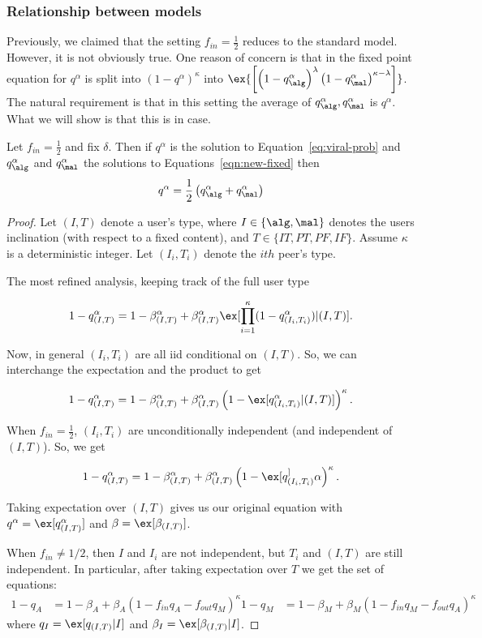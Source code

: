 \subsubsection{Relationship between models}

Previously, we claimed that the setting $f_{in} = \frac{1}{2}$ reduces to the standard model. However, it is not obviously true. One reason of concern is that in the fixed point equation for $q^\alpha$ is split into ${\left(1-q^\alpha\right)}^\kappa $ into $\ex{\left[ \left(1-q_\alg^\alpha\right)^\lambda {\left(1-q_\mal^\alpha\right)}^{\kappa -\lambda} \right]} $. The natural requirement is that in this setting the average of $q_\alg^\alpha, q_\mal^\alpha$ is $q^\alpha$. What we will show is that this is in case.  
\begin{proposition}
    Let $f_{in} = \frac{1}{2}$ and fix $\delta$. Then if $q^\alpha$ is the solution to Equation~\ref{eq:viral-prob} and $q_\alg^\alpha$ and $q_\mal^\alpha$ the solutions to Equations~\ref{eqn:new-fixed} then 
    \[q^\alpha = \frac{1}{2} \left(q_\alg^\alpha + q_\mal^\alpha \right)\]
\end{proposition}
\begin{proof}
    Let $(I, T)$ denote a user's type, where $I \in \{\alg, \mal\}$ denotes the users inclination (with respect to a fixed content), and $T \in \{IT, PT, PF, IF\}$. Assume $\kappa$ is a deterministic integer. Let $(I_i, T_i)$ denote the $ith$ peer's type. 

    The most refined analysis, keeping track of the full user type

    \[ 1 - q_{(I,T)}^\alpha = 1 - \beta_{(I,T)}^\alpha + \beta_{(I,T)}^\alpha \ex[  \prod_{i=1}^\kappa  (1 - q_{(I_i, T_i)}^\alpha )  |  (I,T) ]. \] 

   Now, in general $(I_i, T_i)$ are all iid conditional on $(I, T)$. So, we can interchange the expectation and the product to get 

    \[ 1 - q_{(I,T)}^\alpha = 1 - \beta_{(I,T)}^\alpha + \beta_{(I,T)}^\alpha    \left(1 - \ex[ q_{(I_i, T_i)}^\alpha   | (I, T)  ] \right)^\kappa. \] 

    When $f_{in} = \frac{1}{2}$, $(I_i, T_i)$ are unconditionally independent (and independent of $(I,T)$). So, we get

     \[ 1 - q_{(I,T)}^\alpha  = 1 - \beta_{(I,T)}^\alpha  + \beta_{(I,T)}^\alpha  \left(1 - \ex[ q_{(I_i, T_i)}^]\alpha\right)^\kappa. \]

    Taking expectation over $(I, T)$ gives us our original equation with $q^\alpha = \ex[ q_{(I, T)}^\alpha]$ and $\beta = \ex[ \beta_{(I, T)}]$. 

    When $f_{in} \neq 1/2$, then $I$ and $I_i$ are not independent, but $T_i$ and $(I, T)$ are still independent. In particular, after taking expectation over $T$ we get the set of equations:
    \begin{align*}
    1 - q_A &= 1 - \beta_A + \beta_A \left(1 - f_{in} q_A - f_{out} q_M\right)^\kappa 
    1 - q_M &= 1 - \beta_M + \beta_M \left(1 - f_{in} q_M - f_{out} q_A\right)^\kappa 
    \end{align*}
where $q_I = \ex[ q_{(I, T)}| I ]$ and $\beta_I = \ex[ \beta_{(I,T)} | I]$. 
\end{proof}

